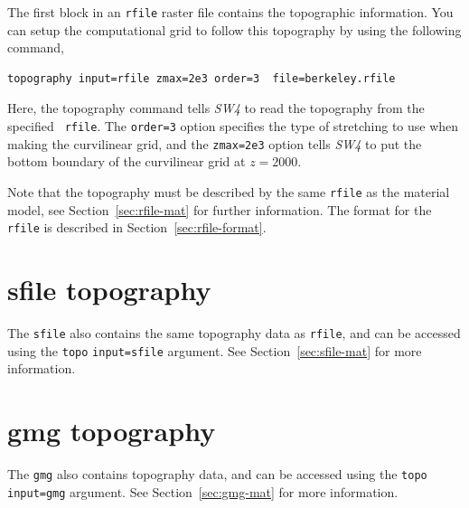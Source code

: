 \documentclass[11pt]{report}
\begin{document}
{The first block in an \verb+rfile+ raster file contains the topographic
information. You can setup the computational grid to follow this topography by using the following command,
\begin{verbatim}
topography input=rfile zmax=2e3 order=3  file=berkeley.rfile
\end{verbatim}
Here, the topography command tells \emph{SW4} to read the topography from the specified {\tt
		rfile}. The \verb+order=3+ option specifies the type of
stretching to use when making the curvilinear grid, and the \verb+zmax=2e3+ option tells \emph{SW4}
to put the bottom boundary of the curvilinear grid at $z=2000$.

Note that the topography must be described by the same {\tt rfile} as the material model, see
Section~\ref{sec:rfile-mat} for further information. The format
for the \verb+rfile+ is described in Section~\ref{sec:rfile-format}.

\section{sfile topography}\label{sec:topo-sfile}
The \verb+sfile+ also contains the same topography data as \verb+rfile+, and can be accessed using
the \verb+topo+ \verb+input=sfile+ argument.
See Section~\ref{sec:sfile-mat} for more information.


\section{gmg topography}\label{sec:topo-gmg}
The \verb+gmg+ also contains topography data, and can be accessed using
the \verb+topo+ \verb+input=gmg+ argument.
See Section~\ref{sec:gmg-mat} for more information.


}
\end{document}
